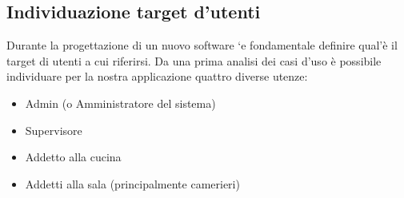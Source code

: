\subsection{Individuazione target d'utenti}
    \begin{flushleft}
    Durante la progettazione di un nuovo software `e
    fondamentale definire qual'è il target di utenti a cui riferirsi. Da una
    prima analisi dei casi d'uso è possibile individuare per la nostra applicazione
    quattro diverse utenze:
        \begin{itemize}
            \item Admin (o Amministratore del sistema)
            \item Supervisore
            \item Addetto alla cucina
            \item Addetti alla sala (principalmente camerieri)
        \end{itemize}
    \end{flushleft}